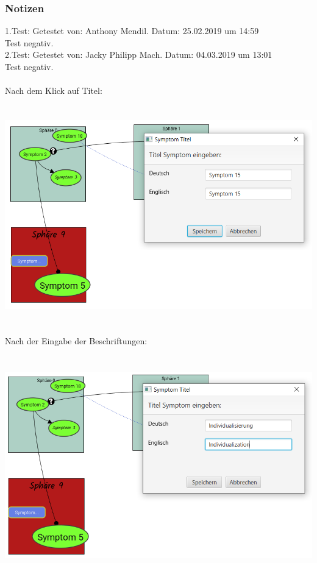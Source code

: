 \documentclass[enabledeprecatedfontcommands]{scrartcl}
\begin{document}
\subsubsection{Notizen}
1.Test: Getestet von: Anthony Mendil. Datum: 25.02.2019 um 14:59 \\
Test negativ. \\
2.Test: Getestet von: Jacky Philipp Mach. Datum: 04.03.2019 um 13:01 \\
Test negativ.\\\\
Nach dem Klick auf Titel: 
\begin{center}
\includegraphics[height=9.5cm]{3_44oeffnen.PNG}
\end{center}
Nach der Eingabe der Beschriftungen:
\begin{center}
\includegraphics[height=9.5cm]{3_44eingabe.PNG}
\end{center}
\end{document}
